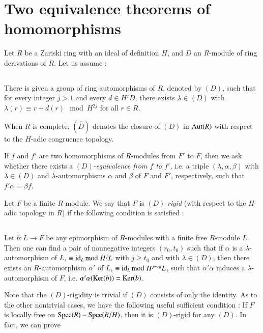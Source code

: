 \section{Two equivalence theorems of homomorphisms}\label{art10-sec2}

Let $R$ be a Zariski ring with an ideal of definition $H$, and $D$ an $R$-module of ring derivations of $R$. Let us assume :

\subsection{}\label{art10-sec2.1}
There is given a group of ring automorphisms of $R$, denoted by $(D)$, such that for every integer $j>1$ and every $d\in H^{j}D$, there exists $\lambda\in (D)$ with $\lambda(r)\equiv r+d(r)\mod H^{2j}$ for all $r\in R$.

When $R$ is complete, $(\widehat{D})$ denotes the closure of $(D)$ in $\operatorname{\mathrm{Aut}}(R)$ with respect to the $H$-adic congruence topology.

If $f$ and $f'$ are two homomorphisms of $R$-modules from $F'$ to $F$, then we ask whether there exists a $(D)$-{\em equivalence from $f$ to $f'$,} i.e. a triple $(\lambda,\alpha,\beta)$ with $\lambda\in (D)$ and $\lambda$-automorphisms $\alpha$ and $\beta$ of $F$ and $F'$, respectively, such that $f'\alpha=\beta f$.

Let $F$ be a finite $R$-module. We say that $F$ is $(D)$-{\em rigid} (with respect to the $H$-adic topology in $R$) if the following condition is satisfied :

\subsection{}\label{art10-sec2.2}
Let $b:L\to F$ be any epimorphism of $R$-modules with a finite free $R$-module $L$. Then one can find a pair of nonnegative integers $(r_{0},t_{0})$ such that if $\alpha$ is a $\lambda$-automorphism of $L$, $\equiv \operatorname{\mathrm{id}}_{L}{\rm{mod}}\kern.3em H^{j}L$ with $j\geq t_{0}$ and with $\lambda\in (D)$, then there exists an $R$-automorphism $\alpha'$ of $L$, $\equiv \operatorname{\mathrm{id}}_{L}{\rm{mod}}\kern.3em H^{j-r_{0}}L$, such that $\alpha'\alpha$ induces a $\lambda$-automorphism of $F$, i.e. $\alpha'\alpha(\operatorname{\mathrm{Ker}}(b))=\operatorname{\mathrm{Ker}}(b)$.

Note that the $(D)$-rigidity is trivial if $(D)$ consists of only the identity. As to the other nontrivial cases, we have the following useful sufficient condition : If $F$ is locally free on $\operatorname{\mathrm{Spec}}(R)-\operatorname{\mathrm{Spec}} (R/H)$, then it is $(D)$-rigid for any $(D)$. In fact, we can prove 


